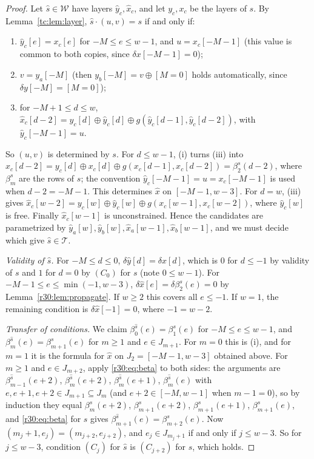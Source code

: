 \begin{proof}
Let $\hat s\in\mathcal{W}$ have layers $\hat y_c,\hat x_c$, and let $y_c,x_c$ be the layers of $s$. By Lemma~\ref{tc:lem:layer}, $\hat s\cdot(u,v)=s$ if and only if:
\begin{enumerate}
\item[(i)] $\hat y_c[e]=x_c[e]$ for $-M\le e\le w-1$, and $u=x_c[-M-1]$ (this value is common to both copies, since $\delta x[-M-1]=0$);
\item[(ii)] $v=y_a[-M]$ (then $y_b[-M]=v\oplus[M=0]$ holds automatically, since $\delta y[-M]=[M=0]$);
\item[(iii)] for $-M+1\le d\le w$, $\hat x_c[d-2]=y_c[d]\oplus\hat y_c[d]\oplus g(\hat y_c[d-1],\hat y_c[d-2])$, with $\hat y_c[-M-1]=u$.
\end{enumerate}
So $(u,v)$ is determined by $s$. For $d\le w-1$, (i) turns (iii) into $\hat x_c[d-2]=y_c[d]\oplus x_c[d]\oplus g(x_c[d-1],x_c[d-2])=\beta^s_2(d-2)$, where $\beta^s_m$ are the rows of $s$; the convention $\hat y_c[-M-1]=u=x_c[-M-1]$ is used when $d-2=-M-1$. This determines $\hat x$ on $[-M-1,w-3]$. For $d=w$, (iii) gives $\hat x_c[w-2]=y_c[w]\oplus\hat y_c[w]\oplus g(x_c[w-1],x_c[w-2])$, where $\hat y_c[w]$ is free. Finally $\hat x_c[w-1]$ is unconstrained. Hence the candidates are parametrized by $\hat y_a[w],\hat y_b[w],\hat x_a[w-1],\hat x_b[w-1]$, and we must decide which give $\hat s\in\mathcal{T}$.

\emph{Validity of $\hat s$.} For $-M\le d\le0$, $\delta\hat y[d]=\delta x[d]$, which is $0$ for $d\le-1$ by validity of $s$ and $1$ for $d=0$ by $(C_0)$ for $s$ (note $0\le w-1$). For $-M-1\le e\le\min(-1,w-3)$, $\delta\hat x[e]=\delta\beta^s_2(e)=0$ by Lemma~\ref{r30:lem:propagate}. If $w\ge2$ this covers all $e\le-1$. If $w=1$, the remaining condition is $\delta\hat x[-1]=0$, where $-1=w-2$.

\emph{Transfer of conditions.} We claim $\beta^{\hat s}_0(e)=\beta^s_1(e)$ for $-M\le e\le w-1$, and $\beta^{\hat s}_m(e)=\beta^s_{m+1}(e)$ for $m\ge1$ and $e\in J_{m+1}$. For $m=0$ this is (i), and for $m=1$ it is the formula for $\hat x$ on $J_2=[-M-1,w-3]$ obtained above. For $m\ge1$ and $e\in J_{m+2}$, apply \eqref{r30:eq:beta} to both sides: the arguments are $\beta^{\hat s}_{m-1}(e+2)$, $\beta^{\hat s}_m(e+2)$, $\beta^{\hat s}_m(e+1)$, $\beta^{\hat s}_m(e)$ with $e,e+1,e+2\in J_{m+1}\subseteq J_m$ (and $e+2\in[-M,w-1]$ when $m-1=0$), so by induction they equal $\beta^s_m(e+2)$, $\beta^s_{m+1}(e+2)$, $\beta^s_{m+1}(e+1)$, $\beta^s_{m+1}(e)$, and \eqref{r30:eq:beta} for $s$ gives $\beta^{\hat s}_{m+1}(e)=\beta^s_{m+2}(e)$. Now $(m_j+1,e_j)=(m_{j+2},e_{j+2})$, and $e_j\in J_{m_j+1}$ if and only if $j\le w-3$. So for $j\le w-3$, condition $(C_j)$ for $\hat s$ is $(C_{j+2})$ for $s$, which holds.


\end{proof}
